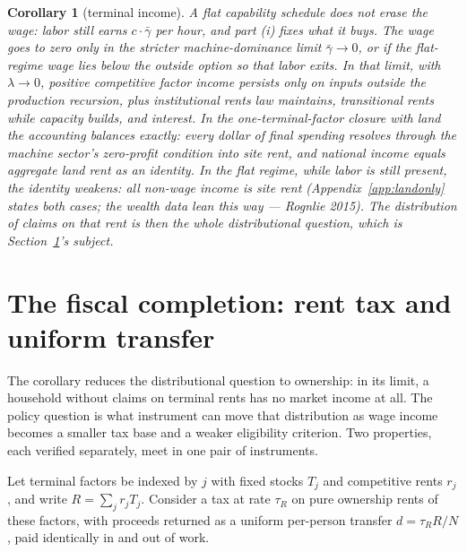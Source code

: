 \documentclass[12pt]{article}
\theoremstyle{plain}
\newtheorem*{corollary}{Corollary}
\begin{document}
\begin{corollary}[terminal income]
A flat capability schedule does not erase the wage: labor still earns $c\cdot\bar{\gamma}$ per hour, and part (i) fixes what it buys. The wage goes to zero only in the stricter machine-dominance limit $\bar{\gamma}\to0$, or if the flat-regime wage lies below the outside option so that labor exits. In that limit, with $\lambda \to 0$, positive competitive factor income persists only on inputs outside the production recursion, plus institutional rents law maintains, transitional rents while capacity builds, and interest. In the one-terminal-factor closure with land the accounting balances exactly: every dollar of final spending resolves through the machine sector's zero-profit condition into site rent, and national income equals aggregate land rent as an identity. In the flat regime, while labor is still present, the identity weakens: all non-wage income is site rent (Appendix~\ref{app:landonly} states both cases; the wealth data lean this way --- Rognlie 2015). The distribution of claims on that rent is then the whole distributional question, which is Section~\ref{sec:fiscal}'s subject.
\end{corollary}

\section{The fiscal completion: rent tax and uniform transfer}\label{sec:fiscal}

The corollary reduces the distributional question to ownership: in its limit, a household without claims on terminal rents has no market income at all. The policy question is what instrument can move that distribution as wage income becomes a smaller tax base and a weaker eligibility criterion. Two properties, each verified separately, meet in one pair of instruments.

Let terminal factors be indexed by $j$ with fixed stocks $T_j$ and competitive rents $r_j$, and write $R = \sum _j r_j T_j$. Consider a tax at rate $\tau _R$ on pure ownership rents of these factors, with proceeds returned as a uniform per-person transfer $d = \tau _R R/N$, paid identically in and out of work.
\end{document}
